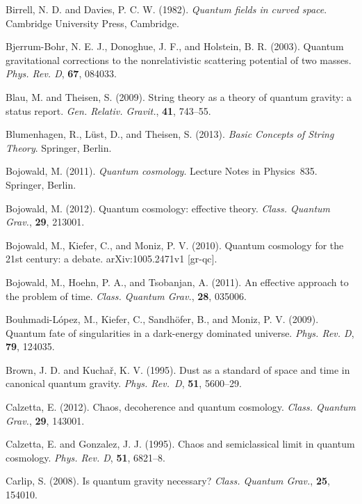 \documentclass[12pt,a4paper]{article}
\begin{document}
\bibitem{} Birrell, N. D. and Davies, P. C. W. (1982).
           {\em Quantum fields in curved space}. Cambridge University Press,
           Cambridge.

\bibitem{} Bjerrum-Bohr, N. E. J., Donoghue, J. F., and
           Holstein, B. R. (2003). Quantum gravitational corrections
           to the nonrelativistic scattering potential of two masses.
           {\em Phys. Rev. D}, {\bf 67}, 084033.

\bibitem{} Blau, M. and Theisen, S. (2009).
           String theory as a theory of quantum gravity: a status
           report. {\em Gen. Relativ. Gravit.}, {\bf 41}, 743--55.

\bibitem{} Blumenhagen, R., L\"ust, D., and Theisen, S. (2013).
{\em Basic Concepts of String Theory}. Springer, Berlin.

\bibitem{} Bojowald, M. (2011). {\em Quantum cosmology}. 
           Lecture Notes in Physics~835. Springer, Berlin.

\bibitem{} Bojowald, M. (2012). Quantum cosmology: effective theory.
       {\em Class. Quantum Grav.}, {\bf 29}, 213001.

\bibitem{} Bojowald, M., Kiefer, C., and Moniz, P. V. (2010).
           Quantum cosmology for the 21st century: a debate.
           arXiv:1005.2471v1 [gr-qc].

\bibitem{} Bojowald, M., Hoehn, P. A., and Tsobanjan, A. (2011).
       An effective approach to the problem of time.
       {\em Class. Quantum Grav.}, {\bf 28}, 035006.

\bibitem{} Bouhmadi-L\'opez, M., Kiefer, C., Sandh\"ofer, B., and
           Moniz, P. V. (2009).
           Quantum fate of singularities in a dark-energy dominated
           universe. {\em Phys. Rev. D}, {\bf 79}, 124035.

\bibitem{} Brown, J. D. and Kucha\v{r}, K. V. (1995). Dust as a standard
           of space and time in canonical quantum gravity.
           {\em Phys. Rev.~D}, {\bf 51}, 5600--29.

\bibitem{} Calzetta, E. (2012). Chaos, decoherence and quantum
  cosmology. {\em Class. Quantum Grav.}, {\bf 29}, 143001.

\bibitem{} Calzetta, E. and Gonzalez, J. J. (1995). 
          Chaos and semiclassical limit in quantum cosmology.
          {\em Phys. Rev. D}, {\bf 51}, 6821--8.

\bibitem{} Carlip, S. (2008). Is quantum gravity necessary? 
          {\em Class. Quantum Grav.}, {\bf 25}, 154010.
\end{document}

